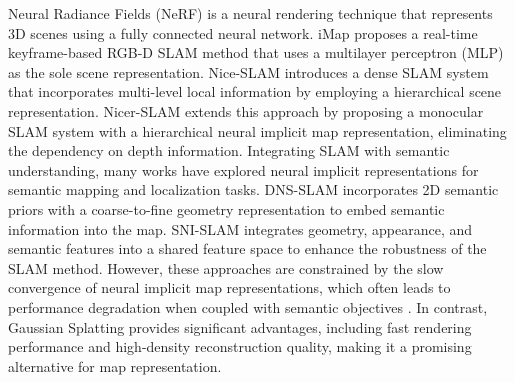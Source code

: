     Neural Radiance Fields (NeRF) \cite{mildenhall2021nerf} is a neural rendering technique that represents 3D scenes using a fully connected neural network.
    iMap \cite{sucar2021imap} proposes a real-time keyframe-based RGB-D SLAM method that uses a multilayer perceptron (MLP) as the sole scene representation.
    Nice-SLAM \cite{zhu2022nice} introduces a dense SLAM system that incorporates multi-level local information by employing a hierarchical scene representation.
    Nicer-SLAM \cite{zhu2024nicer} extends this approach by proposing a monocular SLAM system with a hierarchical neural implicit map representation, eliminating the dependency on depth information.
    Integrating SLAM with semantic understanding, many works \cite{li2023dns, zhu2023sni, haghighi2023neural} have explored neural implicit representations for semantic mapping and localization tasks. 
    DNS-SLAM \cite{li2023dns} incorporates 2D semantic priors with a coarse-to-fine geometry representation to embed semantic information into the map.
    SNI-SLAM \cite{zhu2023sni} integrates geometry, appearance, and semantic features into a shared feature space to enhance the robustness of the SLAM method.
    However, these approaches are constrained by the slow convergence of neural implicit map representations, which often leads to performance degradation when coupled with semantic objectives \cite{Hu2022CVPR, Liu2023ICCV}. 
    In contrast, Gaussian Splatting provides significant advantages, including fast rendering performance and high-density reconstruction quality, making it a promising alternative for map representation.

    


